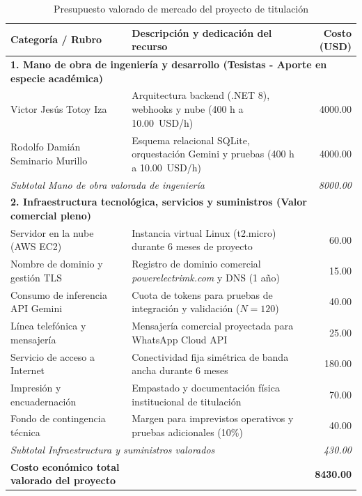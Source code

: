 \begin{table}[H]
\centering
\caption{Presupuesto valorado de mercado del proyecto de titulación}
\label{tab:presupuesto}
\small
\begin{tabular}{p{5.2cm} p{6.8cm} r}
\toprule
\textbf{Categoría / Rubro} & \textbf{Descripción y dedicación del recurso} & \textbf{Costo (USD)} \\
\midrule
\multicolumn{3}{l}{\textbf{1. Mano de obra de ingeniería y desarrollo (Tesistas - Aporte en especie académica)}} \\
Victor Jesús Totoy Iza & Arquitectura backend (.NET 8), webhooks y nube (400 h a 10.00~USD/h) & 4000.00 \\
Rodolfo Damián Seminario Murillo & Esquema relacional SQLite, orquestación Gemini y pruebas (400 h a 10.00~USD/h) & 4000.00 \\
\midrule
\multicolumn{2}{l}{\textit{Subtotal Mano de obra valorada de ingeniería}} & \textit{8000.00} \\
\midrule
\multicolumn{3}{l}{\textbf{2. Infraestructura tecnológica, servicios y suministros (Valor comercial pleno)}} \\
Servidor en la nube (AWS EC2) & Instancia virtual Linux (t2.micro) durante 6 meses de proyecto & 60.00 \\
Nombre de dominio y gestión TLS & Registro de dominio comercial \textit{powerelectrimk.com} y DNS (1 año) & 15.00 \\
Consumo de inferencia API Gemini & Cuota de tokens para pruebas de integración y validación ($N=120$) & 40.00 \\
Línea telefónica y mensajería & Mensajería comercial proyectada para WhatsApp Cloud API & 25.00 \\
Servicio de acceso a Internet & Conectividad fija simétrica de banda ancha durante 6 meses & 180.00 \\
Impresión y encuadernación & Empastado y documentación física institucional de titulación & 70.00 \\
Fondo de contingencia técnica & Margen para imprevistos operativos y pruebas adicionales (10\%) & 40.00 \\
\midrule
\multicolumn{2}{l}{\textit{Subtotal Infraestructura y suministros valorados}} & \textit{430.00} \\
\midrule
\textbf{Costo económico total valorado del proyecto} & & \textbf{8430.00} \\
\bottomrule
\end{tabular}
\end{table}

